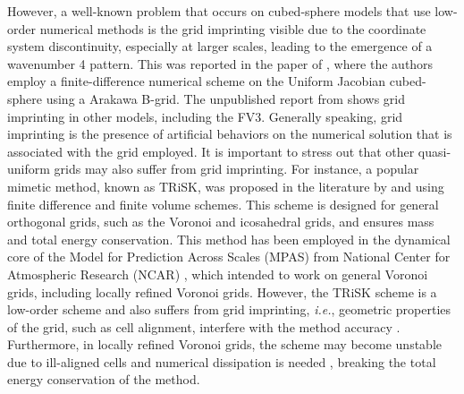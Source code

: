 However, a well-known problem that occurs on cubed-sphere models that use low-order numerical methods
is the grid imprinting visible due to the coordinate system discontinuity, 
especially at larger scales, leading to the emergence of a wavenumber 4 pattern.
This was reported in the paper of \citet{rancic:2017}, where the authors employ a 
finite-difference numerical scheme on the Uniform Jacobian cubed-sphere using a Arakawa B-grid.
The unpublished report from \citet{whitaker:2015} shows grid imprinting in other models, including 
the FV3.
Generally speaking, grid imprinting is the presence of artificial behaviors on 
the numerical solution that is associated with the grid employed.
It is important to stress out that other quasi-uniform grids may also suffer from grid imprinting.
For instance, a popular mimetic method, known as TRiSK, was proposed in the literature by
\citet{thuburn:2009} and \citet{ringler:2010} using finite difference and finite volume schemes.
This scheme is designed for general orthogonal grids, such as the Voronoi and icosahedral grids,
and ensures mass and total energy conservation.
This method has been employed in the dynamical core of the Model for Prediction Across Scales (MPAS)
from National Center for Atmospheric Research (NCAR) \citep{skamarock:12}, 
which intended to work on general Voronoi grids, including locally refined Voronoi grids.
However, the TRiSK scheme is a low-order scheme and also suffers from grid imprinting, \textit{i.e.},
geometric properties of the grid, such as cell alignment, interfere with the method accuracy
\citep{weller:12, peixoto:13, peixoto:16}. Furthermore, in locally refined Voronoi grids,
the scheme may become unstable due to ill-aligned cells and numerical dissipation is needed \citep{santos:2021},
breaking the total energy conservation of the method.

